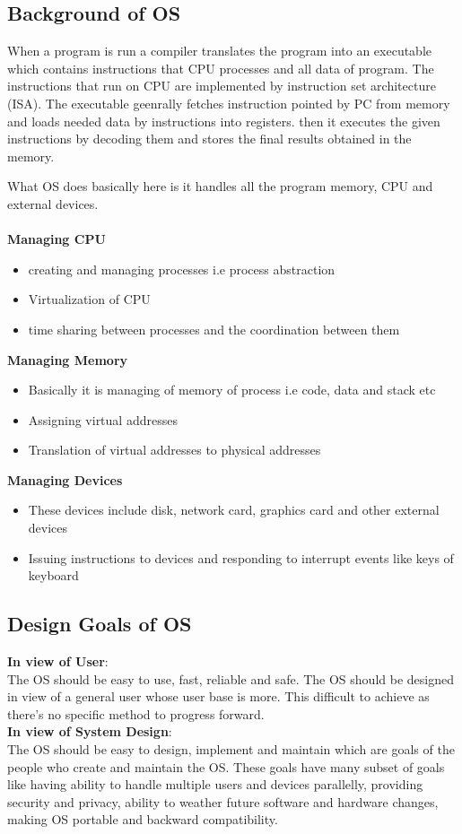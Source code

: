 \documentclass{article}
\begin{document}
\subsection{Background of OS}
When a program is run a compiler translates the program into an executable which contains instructions that CPU processes and all data of program. The instructions that run on CPU are implemented by instruction set architecture (ISA). The executable geenrally fetches instruction pointed by PC from memory and loads needed data by instructions into registers. then it executes the given instructions by decoding them and stores the final results obtained in the memory.

What OS does basically here is it handles all the program memory, CPU and external devices. \\
\\ \textbf{Managing CPU}
\begin{itemize}
    \item creating and managing processes i.e process abstraction
    \item Virtualization of CPU
    \item time sharing between processes and the coordination between them
\end{itemize}
\textbf{Managing Memory}
\begin{itemize}
    \item Basically it is managing of memory of process i.e code, data and stack etc
    \item Assigning virtual addresses
    \item Translation of virtual addresses to physical addresses
\end{itemize}
\textbf{Managing Devices}
\begin{itemize}
    \item These devices include disk, network card, graphics card and other external devices
    \item Issuing instructions to devices  and responding to interrupt events like keys of keyboard
\end{itemize}
\subsection{Design Goals of OS}
\textbf{In view of User}: \\
The OS should be easy to use, fast, reliable and safe. The OS should be designed in view of a general user whose user base is more. This difficult to achieve as there's no specific method to progress forward. \\
\textbf{In view of System Design}: \\
The OS should be easy to design, implement and maintain which are goals of the people who create and maintain the OS. These goals have many subset of goals like having ability to handle multiple users and devices parallelly, providing security and privacy, ability to weather future software and hardware changes, making OS portable and backward compatibility.
\end{document}
